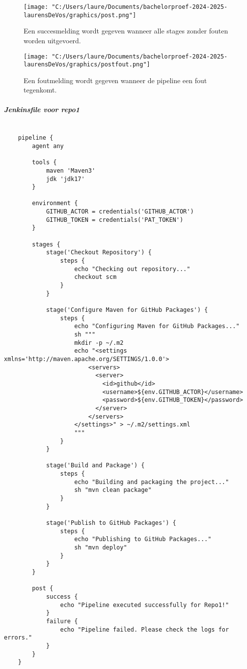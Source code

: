 \begin{figure}[h!]
    \centering
    \texttt{[image: "C:/Users/laure/Documents/bachelorproef-2024-2025-laurensDeVos/graphics/post.png"]}
    \caption{Een succesmelding wordt gegeven wanneer alle stages zonder fouten worden uitgevoerd.}
\end{figure}

\begin{figure}[h!]
    \centering
    \texttt{[image: "C:/Users/laure/Documents/bachelorproef-2024-2025-laurensDeVos/graphics/postfout.png"]}
    \caption{Een foutmelding wordt gegeven wanneer de pipeline een fout tegenkomt.}
\end{figure}

\subparagraph{Jenkinsfile voor repo1} 

\begin{verbatim}
    
    pipeline {
        agent any
        
        tools {
            maven 'Maven3'
            jdk 'jdk17'
        }
        
        environment {
            GITHUB_ACTOR = credentials('GITHUB_ACTOR')
            GITHUB_TOKEN = credentials('PAT_TOKEN')
        }
        
        stages {
            stage('Checkout Repository') {
                steps {
                    echo "Checking out repository..."
                    checkout scm
                }
            }
            
            stage('Configure Maven for GitHub Packages') {
                steps {
                    echo "Configuring Maven for GitHub Packages..."
                    sh """
                    mkdir -p ~/.m2
                    echo "<settings xmlns='http://maven.apache.org/SETTINGS/1.0.0'>
                        <servers>
                          <server>
                            <id>github</id>
                            <username>${env.GITHUB_ACTOR}</username>
                            <password>${env.GITHUB_TOKEN}</password>
                          </server>
                        </servers>
                    </settings>" > ~/.m2/settings.xml
                    """
                }
            }
            
            stage('Build and Package') {
                steps {
                    echo "Building and packaging the project..."
                    sh "mvn clean package"
                }
            }
            
            stage('Publish to GitHub Packages') {
                steps {
                    echo "Publishing to GitHub Packages..."
                    sh "mvn deploy"
                }
            }
        }
        
        post {
            success {
                echo "Pipeline executed successfully for Repo1!"
            }
            failure {
                echo "Pipeline failed. Please check the logs for errors."
            }
        }
    }

    
\end{verbatim}

